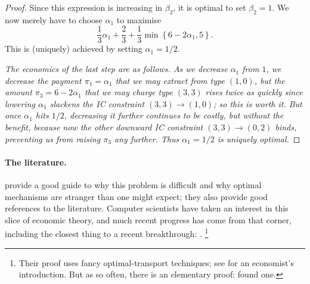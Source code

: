 \begin{proof}
	Since this expression is increasing in $\beta_2$, it is optimal to set $\beta_2 = 1$.
	We now merely have to choose $\alpha_1$ to maximise
	\begin{equation*}
		\frac{1}{3}\alpha_1 + \frac{2}{3}
		+ \frac{1}{3}\min\left\{ 6 - 2 \alpha_1, 5 \right\} .
	\end{equation*}
	This is (uniquely) achieved by setting $\alpha_1 = 1/2$.

	\emph{The economics of the last step are as follows.
	As we decrease $\alpha_1$ from $1$,
	we decrease the payment $\pi_1 = \alpha_1$ that we may extract from type $(1,0)$,
	but the amount $\pi_3 = 6-2\alpha_1$ that we may charge type $(3,3)$ rises twice as quickly since lowering $\alpha_1$ slackens the IC constraint $(3,3) \to (1,0)$;
	so this is worth it.
	But once $\alpha_1$ hits $1/2$, decreasing it further continues to be costly, but without the benefit, because now the other downward IC constraint $(3,3) \to (0,2)$ binds, preventing us from raising $\pi_3$ any further.
	Thus $\alpha_1 = 1/2$ is uniquely optimal.}
\end{proof}

\paragraph{The literature.}
\textcite{HartReny2015} provide a good guide to why this problem is difficult and why optimal mechanisms are stranger than one might expect; they also provide good references to the literature.
Computer scientists have taken an interest in this slice of economic theory, and much recent progress has come from that corner,
including the closest thing to a recent breakthrough: \textcite{DaskalakisDeckelbaumTzamos2017}.%
	\footnote{Their proof uses fancy optimal-transport techniques; see \textcite{Galichon2016} for an economist's introduction. But as so often, there is an elementary proof: \textcite{KleinerManelli2019} found one.}
